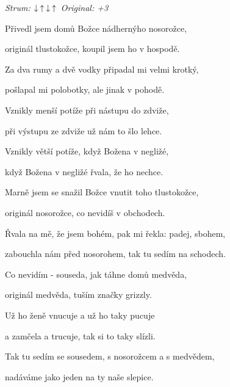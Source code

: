 \begin{song}


\begin{headerbox}
 \quad
\textit{Strum:} $\Down\Up\Down\Up$ \quad
\textit{Original: +3}
\end{headerbox}

\Large

\begin{hchordbox}
\end{hchordbox}

\Large

\bigskip

Přivedl jsem domů Božce nádhernýho nosorožce, \par
{}originál tlustokožce, koupil jsem ho v hospodě. \par
{}Za dva rumy a dvě vodky připadal mi velmi krotký, \par
{}pošlapal mi polobotky, ale jinak v pohodě. \par

\bigskip

Vznikly menší potíže při nástupu do zdviže, \par
{}při výstupu ze zdviže už nám to šlo lehce. \par
{}Vznikly větší potíže, když Božena v negližé, \par
{}když Božena v negližé řvala, že ho nechce. \par

\bigskip

Marně jsem se snažil Božce vnutit toho tlustokožce, \par
{}originál nosorožce, co nevidíš v obchodech. \par
{}Řvala na mě, že jsem bohém, pak mi řekla: padej, sbohem, \par
{}zabouchla nám před nosorohem, tak tu sedím na schodech. \par

\bigskip

Co nevidím - souseda, jak táhne domů medvěda, \par
{}originál medvěda, tuším značky grizzly. \par
{}Už ho ženě vnucuje a už ho taky pucuje \par
a zamčela a trucuje, tak si to taky slízli. \par

\bigskip

Tak tu sedím se sousedem, s nosorožcem a s medvědem, \par
{}nadáváme jako jeden na ty naše slepice. \par

\end{song}
